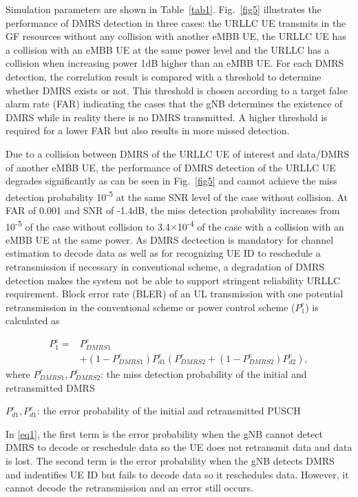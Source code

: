 \documentclass[conference]{IEEEtran}
\begin{document}
Simulation parameters are shown in Table~\ref{tab1}. Fig.~\ref{fig5} illustrates the performance of DMRS detection in three cases: the URLLC UE transmits in the GF resources without any collision with another eMBB UE, the URLLC UE has a collision with an eMBB UE at the same power level and the URLLC has a collision when increasing power 1dB higher than an eMBB UE. For each DMRS detection, the correlation result is compared with a threshold to determine whether DMRS exists or not. This threshold is chosen according to a target false alarm rate (FAR) indicating the cases that the gNB determines the existence of DMRS while in reality there is no DMRS transmitted. A higher threshold is required for a lower FAR but also results in more missed detection.

Due to a collision between DMRS of the URLLC UE of interest and data/DMRS of another eMBB UE, the performance of DMRS detection of the URLLC UE degrades significantly as can be seen in Fig.~\ref{fig5} and cannot achieve the miss detection probability 10\textsuperscript{-5} at the same SNR level of the case without collision. At FAR of 0.001 and SNR of -1.4dB, the miss detection probability increases from 10\textsuperscript{-5} of the case without collision to 3.4$\times$10\textsuperscript{-4} of the case with a collision with an eMBB UE at the same power. As DMRS dectection is mandatory for channel estimation to decode data as well as for recognizing UE ID to reschedule a retransmission if necessary in conventional scheme, a degradation of DMRS detection makes the system not be able to support stringent reliability URLLC requirement. Block error rate (BLER) of an UL transmission with one potential retransmission in the conventional scheme or power control scheme ($ P^{e}_{1}$) is calculated as\useshortskip

\begin{equation}
\begin{split}
 P^{e}_{1} =& P^{e}_{DMRS1} \\
        &+ (1-P^{e}_{DMRS1})P^{e}_{d1}(P^{e}_{DMRS2} + (1-P^{e}_{DMRS2})P^{e}_{d2}),\label{eq1}   
\end{split}
\end{equation}
where $ P^{e}_{DMRS1}, P^{e}_{DMRS2}$: the miss detection probability of the initial and retransmitted DMRS

\quad$P^{e}_{d1}, P^{e}_{d1}$: the error probability of the initial and retransmitted PUSCH

In \eqref{eq1}, the first term is the error probability when the gNB cannot detect DMRS to decode or reschedule data so the UE does not retransmit data and data is lost. The second term is the error probability when the gNB detects DMRS and indentifies UE ID but fails to decode data so it reschedules data. However, it cannot decode the retransmission and an error still occurs.
\end{document}
